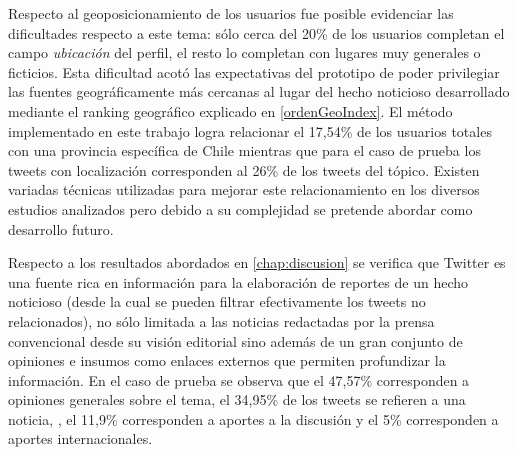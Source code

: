Respecto al geoposicionamiento de los usuarios fue posible evidenciar las dificultades respecto a este tema: sólo cerca del 20\% de los usuarios completan el campo \emph{ubicación} del perfil, el resto lo completan con lugares muy generales o ficticios. Esta dificultad acotó las expectativas del prototipo de poder privilegiar las fuentes geográficamente más cercanas al lugar del hecho noticioso desarrollado mediante el ranking geográfico explicado en \ref{ordenGeoIndex}. El método implementado en este trabajo logra relacionar el 17,54\% de los usuarios totales con una provincia específica de Chile mientras que para el caso de prueba los tweets con localización corresponden al 26\% de los tweets del tópico. Existen variadas técnicas utilizadas para mejorar este relacionamiento en los diversos estudios analizados  \cite{Cheng:2010:YYT:1871437.1871535} \cite{McGee:2011:GST:2063576.2063959} pero debido a su complejidad se pretende abordar como desarrollo futuro. 






Respecto a los resultados abordados en \ref{chap:discusion} se verifica que Twitter es una fuente rica en información para la elaboración de reportes de un hecho noticioso (desde la cual se pueden filtrar efectivamente los tweets no relacionados), no sólo limitada a las noticias redactadas por la prensa convencional desde su visión editorial sino además de un gran conjunto de opiniones e insumos como enlaces externos que permiten profundizar la información. En el caso de prueba se observa que el 47,57\% corresponden a opiniones generales sobre el tema, el 34,95\% de los tweets se refieren a una noticia, , el 11,9\% corresponden a aportes a la discusión y el 5\% corresponden a aportes internacionales.


